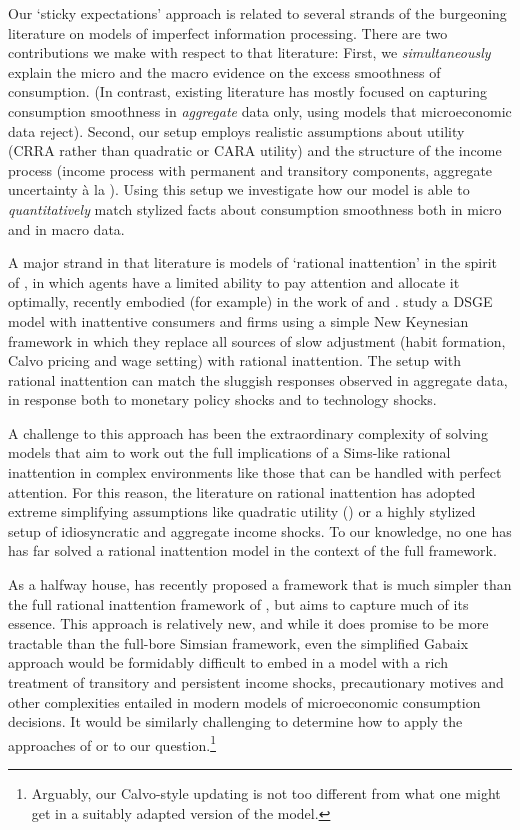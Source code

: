 \documentclass[titlepage]{\econtex}\newcommand{\texname}{cAndCwithStickyE}
\begin{document}
Our `sticky expectations' approach is related to several strands of the burgeoning literature on models of imperfect information processing.  There are two contributions we make with respect to that literature: First, we \textit{simultaneously} explain the micro and the macro evidence on the excess smoothness of consumption. (In contrast, existing literature has mostly focused on capturing consumption smoothness in \emph{aggregate} data only, using models that microeconomic data reject).  Second, our setup employs realistic assumptions about utility (CRRA rather than quadratic or CARA utility) and the structure of the income process (income process with permanent and transitory components, aggregate uncertainty \`a la \cite{ksHetero}). Using this setup we investigate how our model is able to \emph{quantitatively} match stylized facts about consumption smoothness both in micro and in macro data.


A major strand in that literature is models of `rational inattention' in the spirit of \cite{simsInattention}, in which agents have a limited ability to pay attention and allocate it optimally, recently embodied (for example) in the work of \cite{mw09:RI} and \cite{mackWiedREStud15}.  \cite{mackWiedREStud15} study a DSGE model with inattentive consumers and firms using a simple New Keynesian framework in which they replace all sources of slow adjustment (habit formation, Calvo pricing and wage setting) with rational inattention.  The setup with rational inattention can match the sluggish responses observed in aggregate data, in response both to monetary policy shocks and to technology shocks.

A challenge to this approach has been the extraordinary complexity of solving models that aim to work out the full implications of a Sims-like rational inattention in complex environments like those that can be handled with perfect attention. For this reason, the literature on rational inattention has adopted extreme simplifying assumptions like quadratic utility (\cite{luo:inatC}) or a highly stylized setup of idiosyncratic and aggregate income shocks.  To our knowledge, no one has has far solved a rational inattention model in the context of the full \cite{ksHetero} framework.

As a halfway house, \cite{gabaixSparsityQJE} has recently proposed a framework that is much simpler than the full rational inattention framework of \cite{simsInattention}, but aims to capture much of its essence.  This approach is relatively new, and while it does promise to be more tractable than the full-bore Simsian framework, even the simplified Gabaix approach would be formidably difficult to embed in a model with a rich treatment of transitory and persistent income shocks, precautionary motives and other complexities entailed in modern models of microeconomic consumption decisions. It would be similarly challenging to determine how to apply the approaches of \cite{woodfordImperfect} or \cite{msInertiaAER} to our question.\footnote{Arguably, our Calvo-style updating is not too different from what one might get in a suitably adapted version of the \cite{msInertiaAER} model.}
\end{document}
